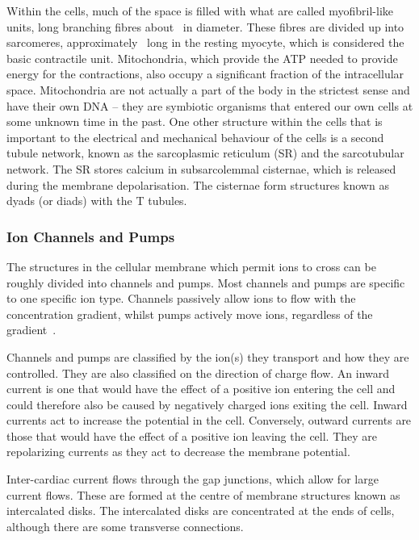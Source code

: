 Within the cells, much of the space is filled with what are called
myofibril-like units, long branching fibres about \ in diameter.
These fibres are divided up into sarcomeres, approximately \ long in the
resting myocyte, which is considered the basic contractile unit.
Mitochondria, which provide the ATP needed to provide energy for the
contractions, also occupy a significant fraction of the intracellular space.
Mitochondria are not actually a part of the body in the strictest sense and
have their own DNA -- they are symbiotic organisms that entered our own cells
at some unknown time in the past.
One other structure within the cells that is important to the electrical and
mechanical behaviour of the cells is a second tubule network, known as the
sarcoplasmic reticulum (SR) and the sarcotubular network.
The SR stores calcium in subsarcolemmal cisternae, which is released during the
membrane depolarisation.
The cisternae form structures known as dyads (or diads) with the T tubules.

\subsubsection{Ion Channels and Pumps}

The structures in the cellular membrane which permit ions to cross can
be roughly divided into channels and pumps.
Most channels and pumps are specific to one specific ion type.
Channels passively allow ions to flow with the concentration gradient, whilst
pumps actively move ions, regardless of the gradient~\cite{Hille2001}.

Channels and pumps are classified by the ion(s) they transport and how they are
controlled.
They are also classified on the direction of charge flow.
An inward current is one that would have the effect of a positive ion entering
the cell and could therefore also be caused by negatively charged ions exiting
the cell.
Inward currents act to increase the potential in the cell.
Conversely, outward currents are those that would have the effect of a positive
ion leaving the cell.
They are repolarizing currents as they act to decrease the membrane potential.

Inter-cardiac current flows through the gap junctions, which allow for large
current flows.
These are formed at the centre of membrane structures known as intercalated
disks.
The intercalated disks are concentrated at the ends of cells, although there are
some transverse connections.

